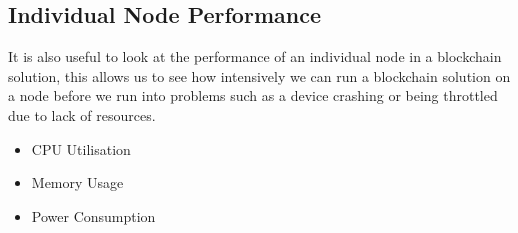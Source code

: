 \subsection{Individual Node Performance}

It is also useful to look at the performance of an individual node in a blockchain solution, this allows us to see how intensively we can run a blockchain solution on a node before we run into problems such as a device crashing or being throttled due to lack of resources.

\begin{itemize}
    \item CPU Utilisation
    \item Memory Usage 
    \item Power Consumption
\end{itemize}
